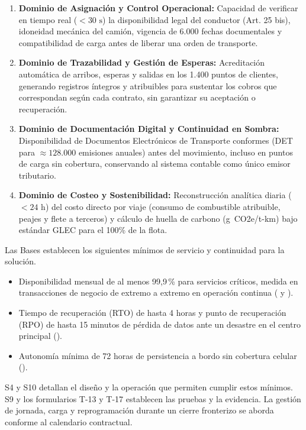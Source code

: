 \begin{enumerate}
  \item \textbf{Dominio de Asignación y Control Operacional:} Capacidad de verificar en tiempo real ($< 30\text{ s}$) la disponibilidad legal del conductor (Art. 25 bis), idoneidad mecánica del camión, vigencia de 6.000 fechas documentales y compatibilidad de carga antes de liberar una orden de transporte.
  \item \textbf{Dominio de Trazabilidad y Gestión de Esperas:} Acreditación automática de arribos, esperas y salidas en los 1.400 puntos de clientes, generando registros íntegros y atribuibles para sustentar los cobros que correspondan según cada contrato, sin garantizar su aceptación o recuperación.
  \item \textbf{Dominio de Documentación Digital y Continuidad en Sombra:} Disponibilidad de Documentos Electrónicos de Transporte conformes (DET para $\approx 128.000$ emisiones anuales) antes del movimiento, incluso en puntos de carga sin cobertura, conservando al sistema contable como único emisor tributario.
  \item \textbf{Dominio de Costeo y Sostenibilidad:} Reconstrucción analítica diaria ($< 24\text{ h}$) del costo directo por viaje (consumo de combustible atribuible, peajes y flete a terceros) y cálculo de huella de carbono (g~CO2e/t-km) bajo estándar GLEC para el 100\% de la flota.
\end{enumerate}

Las Bases establecen los siguientes mínimos de servicio y continuidad para la solución.

\begin{itemize}
  \item Disponibilidad mensual de al menos 99,9\,\% para servicios críticos, medida en transacciones de negocio de extremo a extremo en operación continua ( y ).
  \item Tiempo de recuperación (RTO) de hasta 4 horas y punto de recuperación (RPO) de hasta 15 minutos de pérdida de datos ante un desastre en el centro principal ().
  \item Autonomía mínima de 72 horas de persistencia a bordo sin cobertura celular ().
\end{itemize}

S4 y S10 detallan el diseño y la operación que permiten cumplir estos mínimos. S9 y los formularios T-13 y T-17 establecen las pruebas y la evidencia. La gestión de jornada, carga y reprogramación durante un cierre fronterizo se aborda conforme al calendario contractual.

